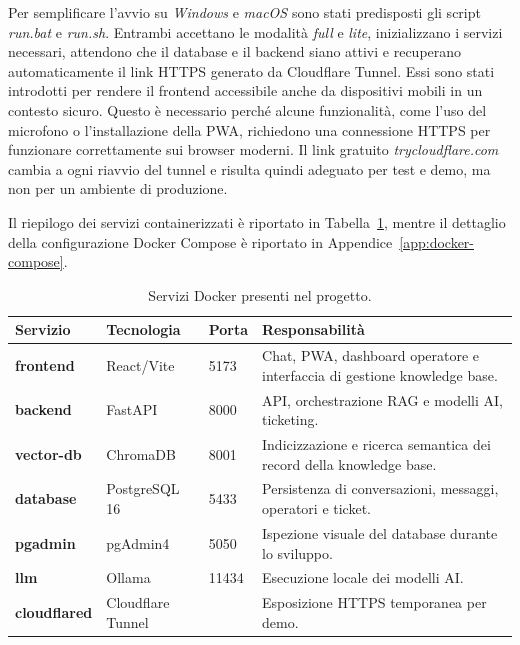 Per semplificare l’avvio su \textit{Windows} e \textit{macOS} sono stati predisposti gli script \textit{run.bat} e \textit{run.sh}. Entrambi accettano le modalità \textit{full} e \textit{lite}, inizializzano i servizi necessari, attendono che il database e il backend siano attivi e recuperano automaticamente il link HTTPS generato da Cloudflare Tunnel. Essi sono stati introdotti per rendere il frontend accessibile anche da dispositivi mobili in un contesto sicuro. Questo è necessario perché alcune funzionalità, come l’uso del microfono o l’installazione della PWA, richiedono una connessione HTTPS per funzionare correttamente sui browser moderni. Il link gratuito \textit{trycloudflare.com} cambia a ogni riavvio del tunnel e risulta quindi adeguato per test e demo, ma non per un ambiente di produzione.

Il riepilogo dei servizi containerizzati è riportato in Tabella~\ref{tab:docker-services}, mentre il dettaglio della configurazione Docker Compose è riportato in Appendice~\ref{app:docker-compose}.

\begin{table}[H]
\centering
\caption{Servizi Docker presenti nel progetto.}
\label{tab:docker-services}
{\small
\begin{tabular}{p{}p{}p{}p{}}
\toprule
\textbf{Servizio} & \textbf{Tecnologia} & \textbf{Porta} & \textbf{Responsabilità}\\
\midrule
\textbf{frontend}& React/Vite & 5173 & Chat, PWA, dashboard operatore e interfaccia di gestione knowledge base.\\
\textbf{backend}& FastAPI & 8000 & API, orchestrazione RAG e modelli AI, ticketing.\\
\textbf{vector-db}& ChromaDB & 8001 & Indicizzazione e ricerca semantica dei record della knowledge base.\\
\textbf{database}& PostgreSQL 16 & 5433 & Persistenza di conversazioni, messaggi, operatori e ticket.\\
\textbf{pgadmin}& pgAdmin4 & 5050 & Ispezione visuale del database durante lo sviluppo.\\
\textbf{llm}& Ollama & 11434 & Esecuzione locale dei modelli AI.\\
\textbf{cloudflared}& Cloudflare Tunnel & \textemdash{} & Esposizione HTTPS temporanea per demo.\\
\bottomrule
\end{tabular}
}
\end{table}